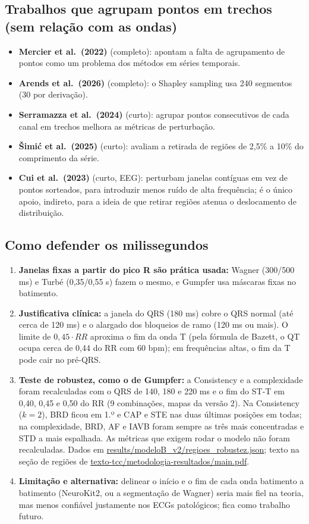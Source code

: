 \documentclass[11pt,a4paper]{article}
\begin{document}
\subsection{Trabalhos que agrupam pontos em trechos (sem relação com as ondas)}
\begin{itemize}
\item \textbf{Mercier et al.\ (2022)} (completo): apontam a falta de agrupamento de pontos como um problema dos métodos em séries temporais.
\item \textbf{Arends et al.\ (2026)} (completo): o Shapley sampling usa 240 segmentos (30 por derivação).
\item \textbf{Serramazza et al.\ (2024)} (curto): agrupar pontos consecutivos de cada canal em trechos melhora as métricas de perturbação.
\item \textbf{Šimić et al.\ (2025)} (curto): avaliam a retirada de regiões de 2,5\% a 10\% do comprimento da série.
\item \textbf{Cui et al.\ (2023)} (curto, EEG): perturbam janelas contíguas em vez de pontos sorteados, para introduzir menos ruído de alta frequência; é o único apoio, indireto, para a ideia de que retirar regiões atenua o deslocamento de distribuição.
\end{itemize}

\subsection{Como defender os milissegundos}
\begin{enumerate}
\item \textbf{Janelas fixas a partir do pico R são prática usada:} Wagner (300/500 ms) e Turbé (0,35/0,55 s) fazem o mesmo, e Gumpfer usa máscaras fixas no batimento.
\item \textbf{Justificativa clínica:} a janela do QRS (180 ms) cobre o QRS normal (até cerca de 120 ms) e o alargado dos bloqueios de ramo (120 ms ou mais). O limite de $0{,}45 \cdot RR$ aproxima o fim da onda T (pela fórmula de Bazett, o QT ocupa cerca de 0,44 do RR com 60 bpm); em frequências altas, o fim da T pode cair no pré-QRS.
\item \textbf{Teste de robustez, como o de Gumpfer:} a Consistency e a complexidade foram recalculadas com o QRS de 140, 180 e 220 ms e o fim do ST-T em 0,40, 0,45 e 0,50 do RR (9 combinações, mapas da versão 2). Na Consistency ($k = 2$), BRD ficou em 1.º e CAP e STE nas duas últimas posições em todas; na complexidade, BRD, AF e IAVB foram sempre as três mais concentradas e STD a mais espalhada. As métricas que exigem rodar o modelo não foram recalculadas. Dados em \url{results/modeloB_v2/regioes_robustez.json}; texto na seção de regiões de \url{texto-tcc/metodologia-resultados/main.pdf}.
\item \textbf{Limitação e alternativa:} delinear o início e o fim de cada onda batimento a batimento (NeuroKit2, ou a segmentação de Wagner) seria mais fiel na teoria, mas menos confiável justamente nos ECGs patológicos; fica como trabalho futuro.
\end{enumerate}
\end{document}
